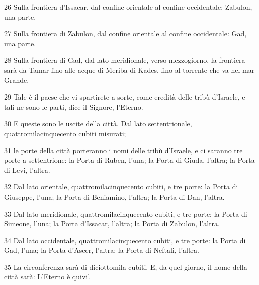 \par 26 Sulla frontiera d'Issacar, dal confine orientale al confine occidentale: Zabulon, una parte.
\par 27 Sulla frontiera di Zabulon, dal confine orientale al confine occidentale: Gad, una parte.
\par 28 Sulla frontiera di Gad, dal lato meridionale, verso mezzogiorno, la frontiera sarà da Tamar fino alle acque di Meriba di Kades, fino al torrente che va nel mar Grande.
\par 29 Tale è il paese che vi spartirete a sorte, come eredità delle tribù d'Israele, e tali ne sono le parti, dice il Signore, l'Eterno.
\par 30 E queste sono le uscite della città. Dal lato settentrionale, quattromilacinquecento cubiti misurati;
\par 31 le porte della città porteranno i nomi delle tribù d'Israele, e ci saranno tre porte a settentrione: la Porta di Ruben, l'una; la Porta di Giuda, l'altra; la Porta di Levi, l'altra.
\par 32 Dal lato orientale, quattromilacinquecento cubiti, e tre porte: la Porta di Giuseppe, l'una; la Porta di Beniamino, l'altra; la Porta di Dan, l'altra.
\par 33 Dal lato meridionale, quattromilacinquecento cubiti, e tre porte: la Porta di Simeone, l'una; la Porta d'Issacar, l'altra; la Porta di Zabulon, l'altra.
\par 34 Dal lato occidentale, quattromilacinquecento cubiti, e tre porte: la Porta di Gad, l'una; la Porta d'Ascer, l'altra; la Porta di Neftali, l'altra.
\par 35 La circonferenza sarà di diciottomila cubiti. E, da quel giorno, il nome della città sarà: L'Eterno è quivi'.


